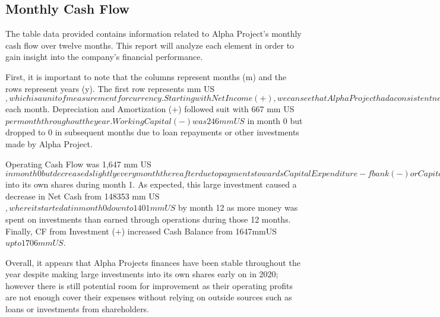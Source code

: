 

\subsection{Monthly Cash Flow}\label{sec:title}

The table data provided contains information related to Alpha Project's monthly cash flow over twelve months. This report will analyze each element in order to gain insight into the company's financial performance. 

First, it is important to note that the columns represent months (m) and the rows represent years (y). The first row represents mm US$, which is a unit of measurement for currency. 

Starting with Net Income (+), we can see that Alpha Project had a consistent net income over all twelve months at 734 mm US$ each month. Depreciation and Amortization (+) followed suit with 667 mm US$ per month throughout the year. Working Capital (-) was 246 mm US$ in month 0 but dropped to 0 in subsequent months due to loan repayments or other investments made by Alpha Project. 

Operating Cash Flow was 1,647 mm US$ in month 0 but decreased slightly every month thereafter due to payments towards Capital Expenditure - fbank (-) or Capital Expenditure - fshare (-). Both of these components were zero for all 12 months except for when Alpha Project invested 150000 mm US$ into its own shares during month 1. As expected, this large investment caused a decrease in Net Cash from 148353 mm US$, where it started at in month 0 down to 1401 mm US$ by month 12 as more money was spent on investments than earned through operations during those 12 months. Finally, CF from Investment (+) increased Cash Balance from 1647mmUS$ up to 1706mmUS$. 

Overall, it appears that Alpha Projects finances have been stable throughout the year despite making large investments into its own shares early on in 2020; however there is still potential room for improvement as their operating profits are not enough cover their expenses without relying on outside sources such as loans or investments from shareholders.